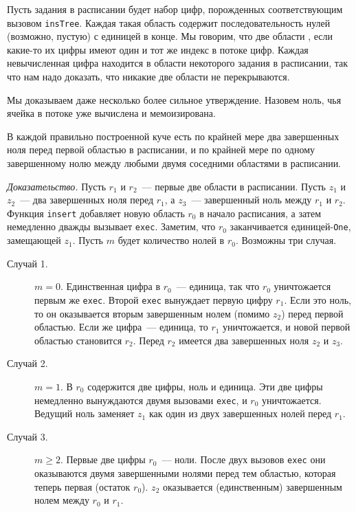 Пусть  задания в расписании будет набор цифр,
порожденных соответствующим вызовом \lstinline!insTree!. Каждая такая
область содержит последовательность нулей (возможно, пустую) с единицей в
конце. Мы говорим, что две области , если
какие-то их цифры имеют один и тот же индекс в потоке цифр. Каждая
невычисленная цифра находится в области некоторого задания в
расписании, так что нам надо доказать, что никакие две области не
перекрываются.

Мы доказываем даже несколько более сильное утверждение. Назовем
 ноль, чья ячейка в потоке уже
вычислена и мемоизирована.

\begin{theorem}\label{th:7.1}
  В каждой правильно построенной куче есть по крайней мере два
  завершенных ноля перед первой областью в расписании, и по крайней
  мере по одному завершенному нолю между любыми двумя соседними
  областями в расписании.

  \emph{Доказательство.} Пусть $r_1$ и $r_2$~--- первые две области в
  расписании. Пусть $z_1$ и $z_2$~--- два завершенных ноля перед
  $r_1$, а $z_3$~--- завершенный ноль между $r_1$ и $r_2$. Функция
  \lstinline!insert! добавляет новую область $r_0$ в начало
  расписания, а затем немедленно дважды вызывает
  \lstinline!exec!. Заметим, что $r_0$ заканчивается
  единицей-\lstinline!One!, замещающей $z_1$. Пусть $m$ будет
  количество нолей в $r_0$. Возможны три случая.
  \begin{description}
  \item[Случай 1.] $m = 0$. Единственная цифра в $r_0$~--- единица, так
    что $r_0$ уничтожается первым же \lstinline!exec!. Второй
    \lstinline!exec! вынуждает первую цифру $r_1$. Если это ноль, то
    он оказывается вторым завершенным нолем (помимо $z_2$) перед
    первой областью. Если же цифра~--- единица, то $r_1$ уничтожается,
    и новой первой областью становится $r_2$.  Перед $r_2$ имеется два
    завершенных ноля $z_2$ и $z_3$.
  \item[Случай 2.] $m = 1$. В $r_0$ содержится две цифры, ноль и
    единица. Эти две цифры немедленно вынуждаются двумя вызовами
    \lstinline!exec!, и $r_0$ уничтожается. Ведущий ноль заменяет
    $z_1$ как один из двух завершенных нолей перед $r_1$.
  \item[Случай 3.] $m \ge 2$. Первые две цифры $r_0$~--- ноли. После
    двух вызовов \lstinline!exec! они оказываются двумя завершенными
    нолями перед тем областью, которая теперь первая (остаток
    $r_0$). $z_2$ оказывается (единственным) завершенным нолем между
    $r_0$ и $r_1$.
  \end{description}
\end{theorem}

